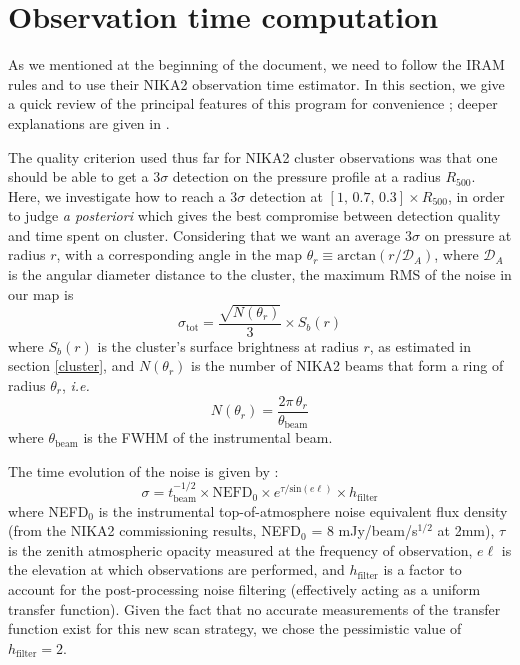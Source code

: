 \documentclass[11pt]{article}
\newcommand{\fh}{_{500}}
\begin{document}
\section{Observation time computation} \label{time}

As we mentioned at the beginning of the document, we need to follow the IRAM rules and to use their NIKA2 observation time estimator.
In this section, we give a quick review of the principal features of this program for convenience ; deeper explanations are given in \cite{Ladjelate2018}.

The quality criterion used thus far for NIKA2 cluster observations was that one should be able to get a $3\sigma$ detection on the pressure profile at a radius $R\fh$.
Here, we investigate how to reach a $3\sigma$ detection at $\left[1,\, 0.7,\, 0.3\right]\times R\fh$, in order to judge \textit{a posteriori} which gives the best compromise between detection quality and time spent on cluster.
Considering that we want an average $3\sigma$ on pressure at radius $r$, with a corresponding angle in the map $\theta_r \equiv \mathrm{arctan}(r/\mathcal{D}_A)$, where $\mathcal{D}_A$ is the angular diameter distance to the cluster, the maximum RMS of the noise in our map is 
    \begin{equation}
        \sigma_\mathrm{tot} = \frac{\sqrt{N(\theta_r)}}{3} \times S_b(r)
        \label{eq:sigma}
    \end{equation}
where $S_b(r)$ is the cluster's surface brightness at radius $r$, as estimated in section \ref{cluster}, and $N(\theta_r)$ is the number of NIKA2 beams that form a ring of radius $\theta_r$, \textit{i.e.}
    \begin{equation}
        N(\theta_r) = \frac{2\pi\,\theta_r}{\theta_\mathrm{beam}}
    \end{equation}
where $\theta_\mathrm{beam}$ is the FWHM of the instrumental beam.

The time evolution of the noise is given by :
    \begin{equation}
        \sigma = t_\mathrm{beam}^{-1/2} \times \mathrm{NEFD}_0 \times e^{\tau/\mathrm{sin}(e\ell)} \times h_\mathrm{filter}
    \end{equation}
where NEFD$_0$ is the instrumental top-of-atmosphere noise equivalent flux density (from the NIKA2 commissioning results, NEFD$_0$ = 8 mJy/beam/s$^{1/2}$ at 2mm), $\tau$ is the zenith atmospheric opacity measured at the frequency of observation, $e\ell$ is the elevation at which observations are performed, and $h_\mathrm{filter}$ is a factor to account for the post-processing noise filtering (effectively acting as a uniform transfer function).
Given the fact that no accurate measurements of the transfer function exist for this new scan strategy, we chose the pessimistic value of $h_\mathrm{filter} = 2$.
\end{document}
